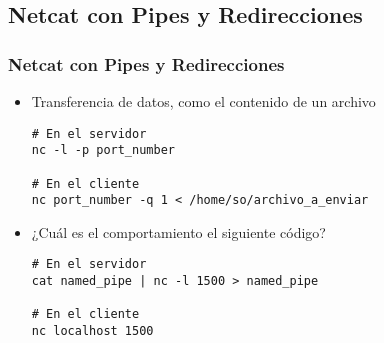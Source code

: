 \subsection{Netcat con Pipes y Redirecciones}
\begin{frame}[fragile]
  \frametitle{Netcat con Pipes y Redirecciones}
  \begin{itemize}
    \item Transferencia de datos, como el contenido de un archivo
      \begin{lstlisting}
# En el servidor      
nc -l -p port_number

# En el cliente
nc port_number -q 1 < /home/so/archivo_a_enviar
      \end{lstlisting}      
    \item ¿Cuál es el comportamiento el siguiente código?
      \begin{lstlisting}
# En el servidor
cat named_pipe | nc -l 1500 > named_pipe

# En el cliente
nc localhost 1500
      \end{lstlisting}
  \end{itemize}
\end{frame}